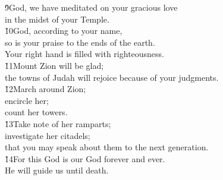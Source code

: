 \begin{poetry}
\poeml \v{9}God, we have meditated on your gracious love \\
\poemll    in the midst of your Temple. \\
\poeml \v{10}God, according to your name, \\
\poemll    so is your praise to the ends of the earth. \\
\poemlll       Your right hand is filled with righteousness. \\
\poeml \v{11}Mount Zion will be glad; \\
\poemll    the towns of Judah will rejoice because of your judgments. \\
\poeml \v{12}March around Zion; \\
\poemll    encircle her; \\
\poemlll       count her towers. \\
\poeml \v{13}Take note of her ramparts; \\
\poemll    investigate her citadels; \\
\poemlll       that you may speak about them to the next generation. \\
\poeml \v{14}For this God is our God forever and ever. \\
\poemll    He will guide us until death.
\end{poetry}

